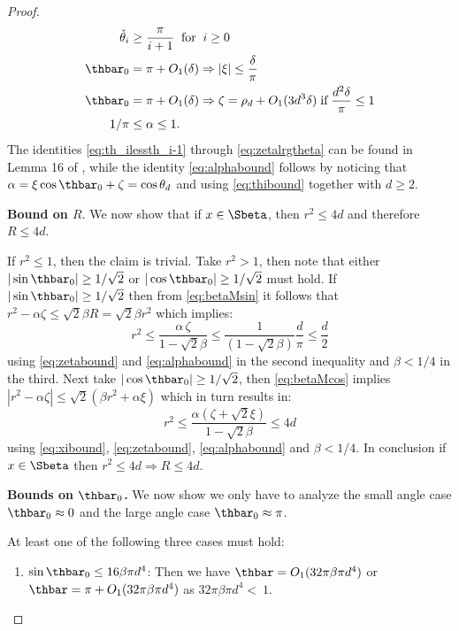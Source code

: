 \begin{proof}
\begin{align}
	\check{\theta}_i &\geq \frac{\pi}{i + 1} \;\;\text{for}\;\; i \geq 0 \label{eq:checkthi2}\\
	\thbar_0 &= \pi + O_1(\delta) \Rightarrow |\xi| \leq \frac{\delta}{\pi} \label{eq:xilrgtheta}\\
	\thbar_0 &= \pi + O_1(\delta) \Rightarrow \zeta = \rho_d + O_1(3 d^3 \delta) \;\text{if}\; \frac{d^2 \delta}{\pi} \leq 1  \label{eq:zetalrgtheta}\\
	1/\pi &\leq \alpha \leq 1 \label{eq:alphabound}.
	\end{align}
	The identities \eqref{eq:th_ilessth_i-1} through \eqref{eq:zetalrgtheta} can be found in Lemma  16 of \cite{HHHV18}, while the identity \eqref{eq:alphabound} follows by noticing that $\alpha = \xi \cos \thbar_0 + \zeta =\cos \theta_d$ and 
	using \eqref{eq:thibound} together with $d\geq 2$.
	\bigskip
	
	\noindent\textbf{Bound on $R$}. We now show that if $x \in \Sbeta$, then $r^2 \leq 4 d$ and therefore $R \leq 4d$.
	
	\noindent If $r^2 \leq 1$, then 
	the claim is trivial. Take $r^2 > 1$, then note that either $|\sin \thbar_0| \geq 1/\sqrt{2}$ or $|\cos \thbar_0| \geq 1/\sqrt{2}$ must hold.
	If $|\sin \thbar_0| \geq 1/\sqrt{2}$ then from \eqref{eq:betaMsin} it follows that $r^2 - \alpha \zeta \leq \sqrt{2} \beta R = \sqrt{2} \beta r^2$ which implies:
	\begin{equation*}
	r^2 \leq \frac{\alpha \,\zeta}{1 - \sqrt{2} \beta}  \leq \frac{1}{(1 - \sqrt{2} \beta)}\frac{d}{\pi} \leq \frac{d}{2}
	\end{equation*}
	using \eqref{eq:zetabound} and \eqref{eq:alphabound} in the second inequality and $\beta < 1/4$ in the third. 
	Next take $|\cos \thbar_0| \geq 1/\sqrt{2}$, then \eqref{eq:betaMcos} implies $|r^2 - \alpha \zeta| \leq \sqrt{2}(\beta r^2 + \alpha \xi)$ which in turn results in:
	\[
	r^2 \leq \frac{\alpha (\zeta + \sqrt{2} \xi)}{1 - \sqrt{2} \beta} \leq 4 d
	\]
	using \eqref{eq:xibound}, \eqref{eq:zetabound}, \eqref{eq:alphabound} and $\beta < 1/4$.  In conclusion if $x \in \Sbeta $  then $r^2 \leq 4 d \Rightarrow R \leq 4 d$.
	\bigskip
	
	
	\noindent \textbf{Bounds on $\thbar_0$.} We now show we only have to analyze the small angle case $\thbar_0 \approx 0$ and the large angle case $\thbar_0 \approx \pi$.  
	
	\noindent At least one of the following three cases must hold:
	\begin{enumerate}
		\itemsep1em
		\item ${\sin \thbar_0 \leq 16 \beta \pi d^4}$:  Then we have $\thbar = O_1(32 \pi \beta \pi d^4)$ or $\thbar = \pi + O_1(32 \pi \beta \pi d^4)$ as $32 \pi \beta \pi d^4 <~1$.
		

\end{enumerate}
\end{proof}
